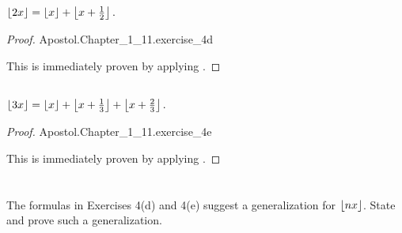 \documentclass{report}
\begin{document}
\subsection{}%
\label{sub:exercise-1.11.4d}

$\left\lfloor2x\right\rfloor = \left\lfloor x\right\rfloor + \left\lfloor x + \frac{1}{2}\right\rfloor.$

\begin{proof}

    {Apostol.Chapter\_1\_11.exercise\_4d}

  This is immediately proven by applying .

\end{proof}

\subsection{}%
\label{sub:exercise-1.11.4e}

$\left\lfloor3x\right\rfloor = \left\lfloor x\right\rfloor + \left\lfloor x + \frac{1}{3}\right\rfloor + \left\lfloor x + \frac{2}{3}\right\rfloor.$

\begin{proof}

    {Apostol.Chapter\_1\_11.exercise\_4e}

  This is immediately proven by applying .

\end{proof}

\section{}%
\label{sec:hermites-identity}

The formulas in Exercises 4(d) and 4(e) suggest a generalization for
  $\left\lfloor nx\right\rfloor$.
State and prove such a generalization.
\end{document}
